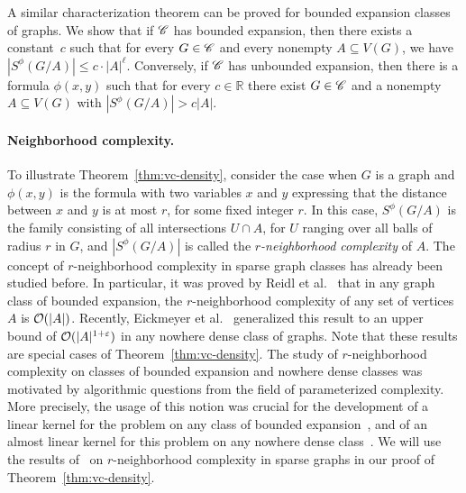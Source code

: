 A similar characterization theorem can be proved for bounded
expansion classes of graphs. We show that if $\mathscr{C}$ has bounded 
expansion, then there exists a constant~$c$ such that for every 
$G\in \mathscr{C}$ and every nonempty $A\subseteq V(G)$, we have 
$|S^\phi(G/A)|\leq c\cdot |A|^\ell$. Conversely, if $\mathscr{C}$ has 
unbounded expansion, then there is a formula $\phi(x,y)$ such 
that for every $c\in \mathbb{R}$ there exist $G\in\mathscr{C}$ and 
a nonempty $A\subseteq V(G)$ with $|S^\phi(G/A)|>c|A|$. 

\paragraph{Neighborhood complexity.}
To illustrate Theorem~\ref{thm:vc-density}, consider the case when
$G$ is a graph and  $\phi(x,y)$ is the formula with two variables $x$ and $y$ expressing that the distance between $x$ and $y$
is at most $r$, for some fixed integer $r$. In this case, $S^\phi(G/A)$ is the family consisting of all intersections $U\cap A$, for $U$ ranging over all balls of radius $r$ in $G$,
and  $|S^\phi(G/A)|$ is called the \emph{$r$-neighborhood complexity} of $A$.
The concept of $r$-neighborhood complexity in sparse graph classes has already been studied before.
In particular, it was proved by Reidl et al.~\cite{reidl2016characterising} that in any graph class of bounded expansion, the $r$-neighborhood complexity of any set of vertices $A$ is $\mathcal{O}(|A|)$.
Recently, Eickmeyer et al.~\cite{eickmeyer2016neighborhood} generalized this result to an upper bound of $\mathcal{O}(|A|^{1+\varepsilon})$ in any nowhere dense class of graphs.
Note that these results are special cases of Theorem~\ref{thm:vc-density}.
%
The study of $r$-neighborhood complexity on classes of bounded expansion and nowhere dense classes was motivated by algorithmic questions from the field of parameterized complexity.
More precisely, the usage of this notion was crucial for the development of a linear kernel for the {} problem on any class of bounded expansion~\cite{drange2016kernelization},
and of an almost linear kernel for this problem on any nowhere dense class~\cite{eickmeyer2016neighborhood}.
We will use the results of~\cite{drange2016kernelization,eickmeyer2016neighborhood} on $r$-neighborhood complexity in sparse graphs in our proof of Theorem~\ref{thm:vc-density}.

